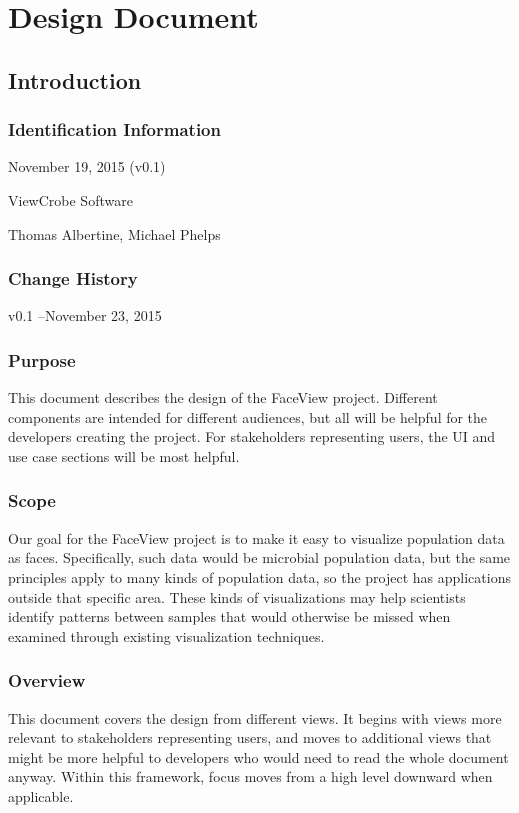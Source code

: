 \documentclass[letterpaper,10pt, onecolumn, draftclsnofoot]{IEEEtran}
\begin{document}
\section{Design Document}
\subsection{Introduction}
\subsubsection{Identification Information}
November 19, 2015 (v0.1)

ViewCrobe Software

Thomas Albertine, Michael Phelps

\subsubsection{Change History}
v0.1 --November 23, 2015

\subsubsection{Purpose}
This document describes the design of the FaceView project. Different components are intended for different audiences, but all will be helpful for the developers creating the project. For stakeholders representing users, the UI and use case sections will be most helpful.

\subsubsection{Scope}
Our goal for the FaceView project is to make it easy to visualize population data as faces. Specifically, such data would be microbial population data, but the same principles apply to many kinds of population data, so the project has applications outside that specific area. These kinds of visualizations may help scientists identify patterns between samples that would otherwise be missed when examined through existing visualization techniques.

\subsubsection{Overview}
This document covers the design from different views. It begins with views more relevant to stakeholders representing users, and moves to additional views that might be more helpful to developers who would need to read the whole document anyway. Within this framework, focus moves from a high level downward when applicable.
\end{document}
